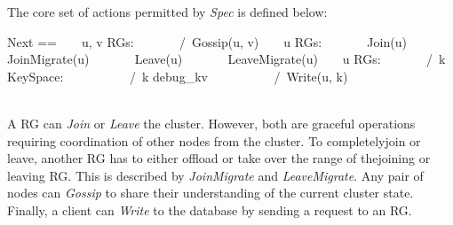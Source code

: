 The core set of actions permitted by \textit{Spec} is defined below:\\
\begin{tla}
Next ==
    \/ \E u, v \in RGs:
        /\ Gossip(u, v)
    \/ \E u \in RGs:
        \/ Join(u) 
        \/ JoinMigrate(u)
        \/ Leave(u)
        \/ LeaveMigrate(u)
    \/ \E u \in RGs:
        /\ \E k \in KeySpace:
            /\ k \notin debug_kv
            /\ Write(u, k)
\end{tla}
\begin{tlatex}
%
%
%
%
%
%
%
%
%
%
%
%
\end{tlatex}
\\

A RG can \textit{Join} or \textit{Leave} the cluster. However, both are graceful
operations requiring coordination of other nodes from the cluster. To completelyjoin or leave, another RG has to either offload or take over the range of thejoining or leaving RG. This is described by \textit{JoinMigrate} and
\textit{LeaveMigrate}. Any pair of nodes can \textit{Gossip} to share their
understanding of the current cluster state. Finally, a client can \textit{Write}
to the database by sending a request to an RG.\\

